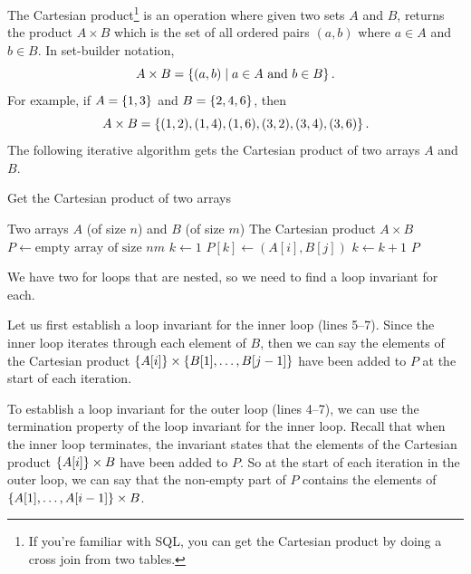 \begin{example}
    The Cartesian product\footnote{If you're familiar with SQL, you can get the Cartesian product by doing a cross join from two tables.} is an operation where given two sets $A$ and $B$, returns the product $A \times B$ which is the set of all ordered pairs $\left(a, b\right)$ where $a \in A$ and $b \in B$. In set-builder notation,
    \[
        A \times B = \left\{\left(a,b\right) \mid a \in A \text{ and } b \in B\right\}.
    \]
    For example, if $A = \left\{1,3\right\}$ and $B = \left\{2,4,6\right\}$, then 
    \[
        A \times B = \left\{(1,2),(1,4),(1,6),(3,2),(3,4),(3,6)\right\}.
    \]
    The following iterative algorithm gets the Cartesian product of two arrays $A$ and $B$.
    \begin{algorithm}[H]
        \caption{Get the Cartesian product of two arrays}
        \begin{algorithmic}[1]
            \Require Two arrays $A$ (of size $n$) and $B$ (of size $m$)
            \Ensure The Cartesian product $A \times B$
                \State $P \gets \text{empty array of size $nm$}$
                \State $k \gets 1$
                        \State $P[k] \gets \left(A[i], B[j]\right)$
                        \State $k \gets k+1$
                    \EndFor
                \EndFor
                \Return $P$
           \EndFunction
       \end{algorithmic}
   \end{algorithm}

   We have two for loops that are nested, so we need to find a loop invariant for each. 

   Let us first establish a loop invariant for the inner loop (lines 5--7). Since the inner loop iterates through each element of $B$, then we can say the elements of the Cartesian product $\left\{A[i]\right\} \times \left\{B[1],\ldots,B[j-1]\right\}$ have been added to $P$ at the start of each iteration.

   To establish a loop invariant for the outer loop (lines 4--7), we can use the termination property of the loop invariant for the inner loop. Recall that when the inner loop terminates, the invariant states that the elements of the Cartesian product $\left\{A[i]\right\} \times B$ have been added to $P$. So at the start of each iteration in the outer loop, we can say that the non-empty part of $P$ contains the elements of $\left\{A[1],\ldots,A[i-1]\right\} \times B$.


\end{example}
